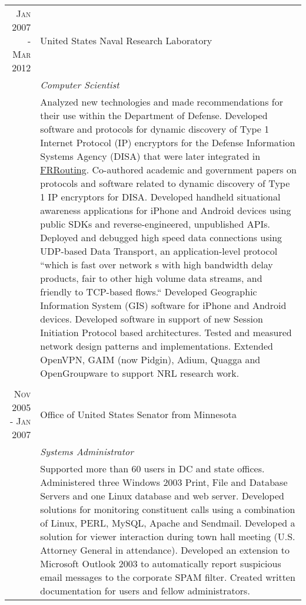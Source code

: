 \documentclass[a4paper,10pt]{article} %
\begin{document}
\begin{tabular}{r|p{11cm}}

\textsc{Jan 2007 - Mar 2012} & United States Naval Research Laboratory\\
& \emph{Computer Scientist} \\
& \footnotesize{Analyzed new technologies and made recommendations for their use within the Department of Defense. Developed software and protocols for dynamic discovery of Type 1 Internet Protocol (IP) encryptors for the Defense Information Systems Agency (DISA) that were later integrated in \href{https://frrouting.org/}{FRRouting}. Co-authored academic and government papers on protocols and software related to dynamic discovery of Type 1 IP encryptors for DISA. Developed handheld situational awareness applications for iPhone and Android devices using public SDKs and reverse-engineered, unpublished APIs. Deployed and debugged high speed data connections using UDP-based Data Transport, an application-level protocol ``which is fast over network
s with high bandwidth delay products, fair to other high volume data streams, and friendly to TCP-based flows.`` Developed Geographic Information System (GIS) software for iPhone and Android devices. Developed software in support of new Session Initiation Protocol based architectures. Tested and measured network design patterns and implementations. Extended OpenVPN, GAIM (now Pidgin), Adium, Quagga and OpenGroupware to support NRL research work.}\\
\multicolumn{2}{c}{} \\


\textsc{Nov 2005 - Jan 2007} & Office of United States Senator from Minnesota\\
& \emph{Systems Administrator} \\
& \footnotesize{Supported more than 60 users in DC and state offices. Administered three Windows 2003 Print, File and Database Servers and one Linux database and web server. Developed solutions for monitoring constituent calls using a combination of Linux, PERL, MySQL, Apache and Sendmail. Developed a solution for viewer interaction during town hall meeting (U.S. Attorney General in attendance). Developed an extension to Microsoft Outlook 2003 to automatically report suspicious email messages to the corporate SPAM filter. Created written documentation for users and fellow administrators.}
\end{tabular}
\end{document}
